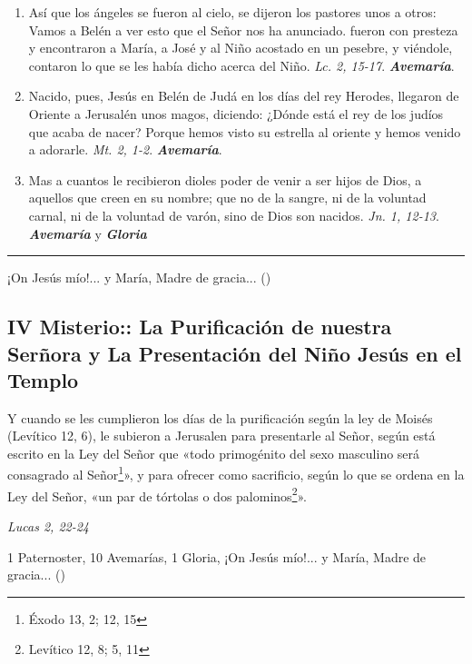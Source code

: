 \documentclass[11pt,a4paper]{book}
\begin{document}
\begin{enumerate}
        \item Así que los ángeles se fueron al cielo, se dijeron los pastores unos a otros: Vamos a Belén a ver esto que el Señor nos ha anunciado. fueron
            con presteza y encontraron a María, a José y al Niño acostado en un pesebre, y viéndole, contaron lo que se les había dicho acerca del
            Niño. \emph{Lc. 2, 15-17}. \textbf{\emph{Avemaría}}.   

        \item Nacido, pues, Jesús en Belén de Judá en los días del rey Herodes, llegaron de Oriente a Jerusalén unos magos, diciendo: ¿Dónde está el rey de los judíos
            que acaba de nacer? Porque hemos visto su estrella al oriente y hemos venido a adorarle. \emph{Mt. 2, 1-2}. \textbf{\emph{Avemaría}}.            
        
        \item Mas a cuantos le recibieron dioles poder de venir a ser hijos de Dios, a aquellos que creen en su nombre; que no de la sangre, ni de la voluntad carnal,
            ni de la voluntad de varón, sino de Dios son nacidos. \emph{Jn. 1, 12-13}. \textbf{\emph{Avemaría}} y \textbf{\emph{Gloria}}
    \end{enumerate}    

    \rule{\textwidth}{0.5pt}
    ¡On Jesús mío!... y María, Madre de gracia... ()

    \subsection*{IV Misterio:: La Purificación de nuestra Serñora y La Presentación del Niño Jesús en el Templo}

    Y cuando se les cumplieron los días de la purificación según la ley de Moisés (Levítico 12, 6), 
    le subieron a Jerusalen para presentarle al Señor, según está escrito en la Ley del Señor que «todo primogénito 
    del sexo masculino será consagrado al Señor\footnote{Éxodo 13, 2; 12, 15\label{primogenito}}», y para ofrecer como sacrificio, 
    según lo que se ordena en la Ley del Señor, «un par de tórtolas o dos palominos\footnote{Levítico 12, 8; 5, 11\label{sacrificio}}». 
    \begin{flushright}
        \emph{Lucas 2, 22-24}
    \end{flushright}

    1 Paternoster, 10 Avemarías, 1 Gloria, ¡On Jesús mío!... y María, Madre de gracia... ()    
\end{document}
